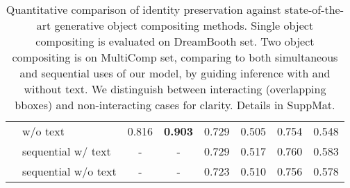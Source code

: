 \begin{table}[t!]
\begin{adjustbox}{width=\linewidth}
\begin{tabular}{lcccccc}
\ \ w/o text                                                                                           &    0.816      &  \textbf{0.903}   &      0.729     &                                                          0.505             &       0.754             &    0.548             \\ 
\ \ sequential w/ text                                                                                          &    -      &  -   &      0.729     &   0.517                                                                  &       0.760             &    0.583              \\ 
\ \ sequential w/o text                                                                                           &    -      &  -   &      0.723     &    0.510                                                                &       0.756             &    0.578              \\ 




\bottomrule
\end{tabular}
\end{adjustbox}
\caption{Quantitative comparison of identity preservation against state-of-the-art generative object compositing methods. Single object compositing is evaluated on DreamBooth set. Two object compositing is on MultiComp set, comparing to both simultaneous and sequential uses of our model, by guiding inference with and without text. We distinguish between interacting (overlapping bboxes) and non-interacting cases for clarity. Details in SuppMat.} %
\label{tab:baselinescomp}
\vspace{-6mm}
\end{table}

